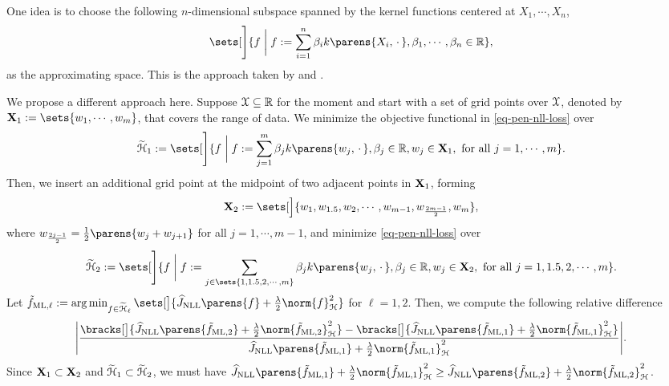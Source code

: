 One idea is to choose the following $n$-dimensional subspace spanned by the kernel functions centered at $X_1, \cdots, X_n$, 
\begin{align}\label{eq-fin-approx-subspace-gu-qiu}
	\sets[\Bigg]{f \biggm| f := \sum_{i=1}^n \beta_i k \parens{X_i, \,\cdot\,}, \beta_1, \cdots, \beta_n \in \Real}, 
\end{align}
as the approximating space. This is the approach taken by \textcite{Gu1993-na} and \textcite{Gu1993-lf}. 

We propose a different approach here. Suppose $\mathcal{X} \subseteq \mathbb{R}$ for the moment and start with a set of grid points over $\mathcal{X}$, denoted by $\bX_1 := \sets{w_1, \cdots, w_m}$, that covers the range of data. We minimize the objective functional in \eqref{eq-pen-nll-loss} over 
\begin{align*}
	\widetilde{\calH}_1 := \sets[\Bigg]{f \biggm| f := \sum_{j=1}^{m} \beta_j k \parens{w_j, \,\cdot\,}, \beta_j \in \Real, w_j \in \bX_1, \text{ for all } j = 1, \cdots, m}. 
\end{align*}
Then, we insert an additional grid point at the midpoint of two adjacent points in $\mathbf{X}_1$, forming 
\begin{align*}
	\bX_2 := \sets[\Big]{w_1, w_{1.5}, w_{2}, \cdots, w_{m-1}, w_{\frac{2m-1}{2}}, w_m}, 
\end{align*}
where $w_{\frac{2j-1}{2}} = \frac{1}{2} \parens{w_{j} + w_{j+1}}$ for all $j = 1, \cdots, m-1$, and minimize \eqref{eq-pen-nll-loss} over 
\begin{align*}
	\widetilde{\calH}_2 := \sets[\Bigg]{f \biggm| f := \sum_{j \in \sets{1, 1.5, 2, \cdots, m}} \beta_j k \parens{w_j, \,\cdot\,}, \beta_j \in \Real, w_j \in \bX_2, \text{ for all } j = 1, 1.5, 2, \cdots, m}. 
\end{align*}
Let $\tilde{f}_{\ML, \ell} := \argmin_{f \in \widetilde{\calH}_{\ell}} \sets[\big]{\widehat{J}_{\NLL} \parens{f} + \frac{\lambda}{2} \norm{f}_{\calH}^2}$ for $\ell = 1, 2$. Then, we compute the following relative difference 
\begin{align}\label{eq-termination-grid-points}
	\abs[\Bigg]{\frac{ \bracks[\big]{\widehat{J}_{\NLL} \parens{\tilde{f}_{\ML, 2}} + \frac{\lambda}{2} \norm{\tilde{f}_{\ML, 2}}_{\calH}^2} - \bracks[\big]{\widehat{J}_{\NLL} \parens{\tilde{f}_{\ML, 1}} + \frac{\lambda}{2} \norm{\tilde{f}_{\ML, 1}}_{\calH}^2 } }{\widehat{J}_{\NLL} \parens{\tilde{f}_{\ML, 1}} + \frac{\lambda}{2} \norm{\tilde{f}_{\ML, 1}}_{\calH}^2 } }. 
\end{align}
Since $\mathbf{X}_1 \subset \mathbf{X}_2$ and $\widetilde{\mathcal{H}}_1 \subset \widetilde{\mathcal{H}}_2$, we must have $\widehat{J}_{\NLL} \parens{\tilde{f}_{\ML, 1}} + \frac{\lambda}{2} \norm{\tilde{f}_{\ML, 1}}_{\calH}^2 \ge \widehat{J}_{\NLL} \parens{\tilde{f}_{\ML, 2}} + \frac{\lambda}{2} \norm{\tilde{f}_{\ML, 2}}_{\calH}^2$. 

